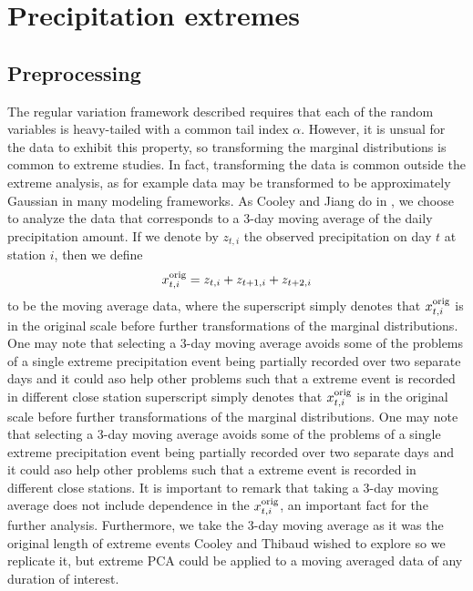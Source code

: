\documentclass[11pt, oneside]{book}
\theoremstyle{plain}
\theoremstyle{remark}
\begin{document}
\section{Precipitation extremes}
\subsection{Preprocessing}
The regular variation framework described requires that each of the random
variables is heavy-tailed with a common tail index $\alpha$.  However, it is
unsual for the data to exhibit this property, so transforming the marginal
distributions is common to extreme studies. In fact, transforming the data is
common outside the extreme analysis, as for example data may be transformed to
be approximately Gaussian in many modeling frameworks. As Cooley and Jiang do in
\cite{jiang-cooley}, we choose to analyze the data that corresponds to a 3-day
moving average of the daily precipitation amount. If we denote by $z_{t,i}$ the
observed precipitation on day $t$ at station $i$, then we define $$x_{t,i}^{\rm
orig} = z_{t,i} + z_{t+1,i} + z_{t+2, i}$$ to be the moving average data, where
the superscript simply denotes that $x_{t,i}^{\rm orig}$ is in the original
scale before further transformations of the marginal distributions. One may note
that selecting a 3-day moving average avoids some of the problems of a single
extreme precipitation event being partially recorded over two separate days and
it could aso help other problems such that a extreme event is recorded in
different close station superscript simply denotes that $x_{t,i}^{\rm orig}$ is
in the original scale before further transformations of the marginal
distributions. One may note that selecting a 3-day moving average avoids some of
the problems of a single extreme precipitation event being partially recorded
over two separate days and it could aso help other problems such that a extreme
event is recorded in different close stations. It is important to remark that
taking a 3-day moving average does not include dependence in the $x_{t,i}^{\rm
orig}$, an important fact for the further analysis. Furthermore, we take the
3-day moving average as it was the original length of extreme events Cooley and
Thibaud wished to explore so we replicate it, but extreme PCA could be applied
to a moving averaged data of any duration of interest.
\end{document}
